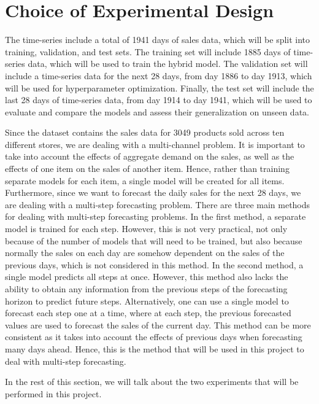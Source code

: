 \section{Choice of Experimental Design}
The time-series include a total of 1941 days of sales data, which will be split into training, validation, and test sets. 
The training set will include 1885 days of time-series data, which will be used to train the hybrid model.
The validation set will include a time-series data for the next 28 days, from day 1886 to day 1913, which will be used for hyperparameter optimization.
Finally, the test set will include the last 28 days of time-series data, from day 1914 to day 1941, which will be used to evaluate and compare the models and assess their generalization on unseen data. 

Since the dataset contains the sales data for 3049 products sold across ten different stores, we are dealing with a multi-channel problem. 
It is important to take into account the effects of aggregate demand on the sales, as well as the effects of one item on the sales of another item.
Hence, rather than training separate models for each item, a single model will be created for all items.
Furthermore, since we want to forecast the daily sales for the next 28 days, we are dealing with a multi-step forecasting problem. 
There are three main methods for dealing with multi-step forecasting problems.
In the first method, a separate model is trained for each step. 
However, this is not very practical, not only because of the number of models that will need to be trained, but also because normally the sales on each day are somehow dependent on the sales of the previous days, which is not considered in this method.
In the second method, a single model predicts all steps at once.
However, this method also lacks the ability to obtain any information from the previous steps of the forecasting horizon to predict future steps.
Alternatively, one can use a single model to forecast each step one at a time, where at each step, the previous forecasted values are used to forecast the sales of the current day.
This method can be more consistent as it takes into account the effects of previous days when forecasting many days ahead.
Hence, this is the method that will be used in this project to deal with multi-step forecasting.

In the rest of this section, we will talk about the two experiments that will be performed in this project.

